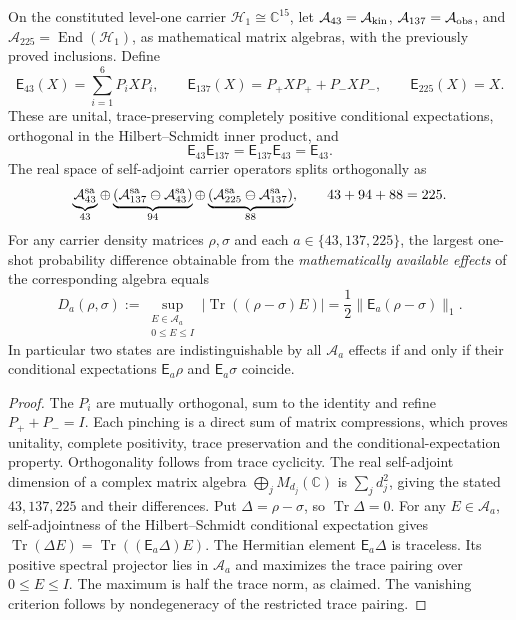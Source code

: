 \documentclass[12pt,a4paper]{article}
\begin{document}
\begin{theorem}
\label{p4a:thm:v347-tier-distance}
On the constituted level-one carrier \(\mathcal H_1\cong\mathbb C^{15}\),
let \(\mathcal A_{43}=\mathcal A_{\rm kin}\),
\(\mathcal A_{137}=\mathcal A_{\rm obs}\), and
\(\mathcal A_{225}=\operatorname{End}(\mathcal H_1)\), as mathematical
matrix algebras, with the previously proved inclusions.  Define
\[
 \mathsf E_{43}(X)=\sum_{i=1}^6P_iXP_i,\qquad
 \mathsf E_{137}(X)=P_+XP_++P_-XP_-,\qquad
 \mathsf E_{225}(X)=X.
\]
These are unital, trace-preserving completely positive conditional
expectations, orthogonal in the Hilbert--Schmidt inner product, and
\[
 \mathsf E_{43}\mathsf E_{137}
 =\mathsf E_{137}\mathsf E_{43}=\mathsf E_{43}.
\]
The real space of self-adjoint carrier operators splits orthogonally as
\[
 \underbrace{\mathcal A_{43}^{\rm sa}}_{43}
 \oplus\underbrace{(\mathcal A_{137}^{\rm sa}
      \ominus\mathcal A_{43}^{\rm sa})}_{94}
 \oplus\underbrace{(\mathcal A_{225}^{\rm sa}
      \ominus\mathcal A_{137}^{\rm sa})}_{88},
 \qquad 43+94+88=225.
\]
For any carrier density matrices \(\rho,\sigma\) and each
\(a\in\{43,137,225\}\), the largest one-shot probability difference
obtainable from the \emph{mathematically available effects} of the
corresponding algebra equals
\begin{equation}\label{p4a:eq:v347-tier-distance}
 \boxed{
 D_a(\rho,\sigma)
 :=\sup_{\substack{E\in\mathcal A_a\\0\le E\le I}}
 \big|\operatorname{Tr}((\rho-\sigma)E)\big|
 =\frac12\|\mathsf E_a(\rho-\sigma)\|_1.}
\end{equation}
In particular two states are indistinguishable by all \(\mathcal A_a\)
effects if and only if their conditional expectations \(\mathsf E_a\rho\)
and \(\mathsf E_a\sigma\) coincide.
\end{theorem}
\begin{proof}
The \(P_i\) are mutually orthogonal, sum to the identity and refine
\(P_++P_-=I\).  Each pinching is a direct sum of matrix compressions,
which proves unitality, complete positivity, trace preservation and the
conditional-expectation property.  Orthogonality follows from trace
cyclicity.  The real self-adjoint dimension of a complex matrix algebra
\(\bigoplus_jM_{d_j}(\mathbb C)\) is \(\sum_jd_j^2\), giving the stated
\(43,137,225\) and their differences.
Put \(\Delta=\rho-\sigma\), so \(\operatorname{Tr}\Delta=0\).  For any
\(E\in\mathcal A_a\), self-adjointness of the Hilbert--Schmidt
conditional expectation gives
\(\operatorname{Tr}(\Delta E)=\operatorname{Tr}((\mathsf E_a\Delta)E)\).
The Hermitian element \(\mathsf E_a\Delta\) is traceless.  Its positive
spectral projector lies in \(\mathcal A_a\) and maximizes the trace
pairing over \(0\le E\le I\).  The maximum is half the trace norm, as
claimed.  The vanishing criterion follows by nondegeneracy of the
restricted trace pairing.
\end{proof}
\end{document}
